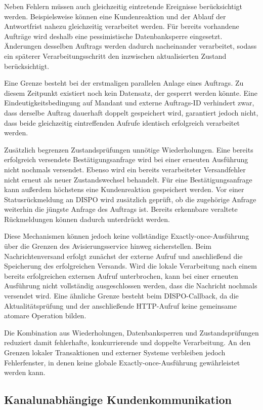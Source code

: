 \documentclass[
  12pt,
  a4paper,
  oneside
]{article}
\begin{document}
Neben Fehlern müssen auch gleichzeitig eintretende Ereignisse berücksichtigt
werden. Beispielsweise können eine Kundenreaktion und der Ablauf der
Antwortfrist nahezu gleichzeitig verarbeitet werden. Für bereits vorhandene
Aufträge wird deshalb eine pessimistische Datenbanksperre eingesetzt.
Änderungen desselben Auftrags werden dadurch nacheinander verarbeitet, sodass
ein späterer Verarbeitungsschritt den inzwischen aktualisierten Zustand
berücksichtigt.

Eine Grenze besteht bei der erstmaligen parallelen Anlage eines Auftrags. Zu
diesem Zeitpunkt existiert noch kein Datensatz, der gesperrt werden könnte.
Eine Eindeutigkeitsbedingung auf Mandant und externe Auftrags-ID verhindert
zwar, dass derselbe Auftrag dauerhaft doppelt gespeichert wird, garantiert
jedoch nicht, dass beide gleichzeitig eintreffenden Aufrufe identisch
erfolgreich verarbeitet werden.

Zusätzlich begrenzen Zustandsprüfungen unnötige Wiederholungen. Eine bereits
erfolgreich versendete Bestätigungsanfrage wird bei einer erneuten
Ausführung nicht nochmals versendet. Ebenso wird ein bereits verarbeiteter
Versandfehler nicht erneut als neuer Zustandswechsel behandelt. Für eine
Bestätigungsanfrage kann außerdem höchstens eine Kundenreaktion gespeichert
werden. Vor einer Statusrückmeldung an DISPO wird zusätzlich geprüft, ob die
zugehörige Anfrage weiterhin die jüngste Anfrage des Auftrags ist. Bereits
erkennbare veraltete Rückmeldungen können dadurch unterdrückt werden.

Diese Mechanismen können jedoch keine vollständige Exactly-once-Ausführung über
die Grenzen des Avisierungsservice hinweg sicherstellen. Beim
Nachrichtenversand erfolgt zunächst der externe Aufruf und anschließend die
Speicherung des erfolgreichen Versands. Wird die lokale Verarbeitung nach
einem bereits erfolgreichen externen Aufruf unterbrochen, kann bei einer
erneuten Ausführung nicht vollständig ausgeschlossen werden, dass die Nachricht
nochmals versendet wird. Eine ähnliche Grenze besteht beim DISPO-Callback, da
die Aktualitätsprüfung und der anschließende HTTP-Aufruf keine gemeinsame
atomare Operation bilden.

Die Kombination aus Wiederholungen, Datenbanksperren und Zustandsprüfungen
reduziert damit fehlerhafte, konkurrierende und doppelte Verarbeitung. An den
Grenzen lokaler Transaktionen und externer Systeme verbleiben jedoch
Fehlerfenster, in denen keine globale Exactly-once-Ausführung gewährleistet
werden kann.

\subsection{Kanalunabhängige Kundenkommunikation}
\label{sec:kundenkommunikation}
\end{document}
